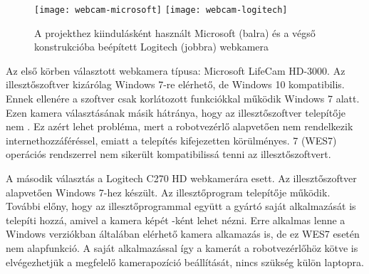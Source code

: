 \documentclass[../documentation.tex]{subfiles}
\begin{document}
\begin{figure}[h]
	\centering
	\texttt{[image: webcam-microsoft]}
	\texttt{[image: webcam-logitech]}
	\caption{A projekthez kiindulásként használt Microsoft (balra) és a végső konstrukcióba beépített Logitech (jobbra) webkamera\protect\footnotemark}
	\label{fig:camera}
\end{figure}

Az első körben választott webkamera típusa: Microsoft LifeCam HD-3000. Az illesztőszoftver kizárólag Windows 7-re elérhető, de Windows 10 kompatibilis. Ennek ellenére a szoftver csak korlátozott funkciókkal működik Windows 7 alatt. Ezen kamera választásának másik hátránya, hogy az illesztőszoftver telepítője nem . Ez azért lehet probléma, mert a robotvezérlő alapvetően nem rendelkezik internethozzáféréssel, emiatt a telepítés kifejezetten körülményes.  7 (WES7) operációs rendszerrel nem sikerült kompatibilissá tenni az illesztőszoftvert.

A második választás a Logitech C270 HD webkamerára esett. Az illesztőszoftver alapvetően Windows 7-hez készült. Az illesztőprogram telepítője  működik. További előny, hogy az illesztőprogrammal együtt a gyártó saját alkalmazását is telepíti hozzá, amivel a kamera képét -ként lehet nézni. Erre alkalmas lenne a Windows verziókban általában elérhető kamera alkamazás is, de ez WES7 esetén nem alapfunkció. A saját alkalmazással így a kamerát a robotvezérlőhöz kötve is elvégezhetjük a megfelelő kamerapozíció beállítását, nincs szükség külön laptopra.

\end{document}
